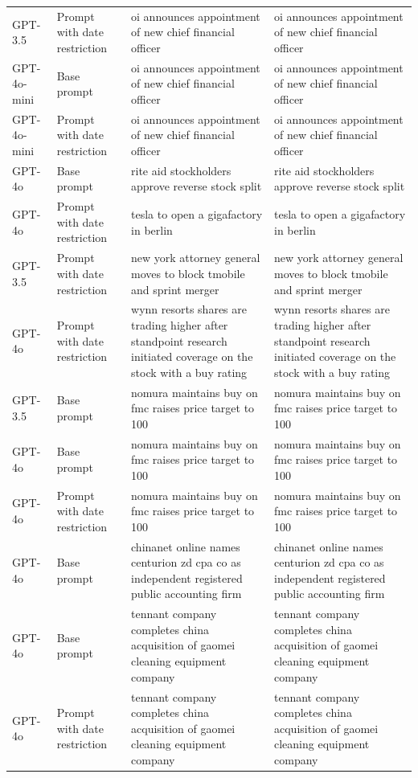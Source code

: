 \begin{longtable}{>{\raggedright\arraybackslash}p{1.4cm}>{\raggedright\arraybackslash}p{1.4cm}>{\raggedright\arraybackslash}p{5.5cm}>{\raggedright\arraybackslash}p{5.5cm}}
GPT-3.5 & Prompt with date restriction & oi announces appointment of new chief financial officer & oi announces appointment of new chief financial officer\\
GPT-4o-mini & Base prompt & oi announces appointment of new chief financial officer & oi announces appointment of new chief financial officer\\
GPT-4o-mini & Prompt with date restriction & oi announces appointment of new chief financial officer & oi announces appointment of new chief financial officer\\
GPT-4o & Base prompt & rite aid stockholders approve reverse stock split & rite aid stockholders approve reverse stock split\\
GPT-4o & Prompt with date restriction & tesla to open a gigafactory in berlin & tesla to open a gigafactory in berlin\\
GPT-3.5 & Prompt with date restriction & new york attorney general moves to block tmobile and sprint merger & new york attorney general moves to block tmobile and sprint merger\\
GPT-4o & Prompt with date restriction & wynn resorts shares are trading higher after standpoint research initiated coverage on the stock with a buy rating & wynn resorts shares are trading higher after standpoint research initiated coverage on the stock with a buy rating\\
GPT-3.5 & Base prompt & nomura maintains buy on fmc raises price target to 100 & nomura maintains buy on fmc raises price target to 100\\
GPT-4o & Base prompt & nomura maintains buy on fmc raises price target to 100 & nomura maintains buy on fmc raises price target to 100\\
GPT-4o & Prompt with date restriction & nomura maintains buy on fmc raises price target to 100 & nomura maintains buy on fmc raises price target to 100\\
GPT-4o & Base prompt & chinanet online names centurion zd cpa co as independent registered public accounting firm & chinanet online names centurion zd cpa co as independent registered public accounting firm\\
GPT-4o & Base prompt & tennant company completes china acquisition of gaomei cleaning equipment company & tennant company completes china acquisition of gaomei cleaning equipment company\\
GPT-4o & Prompt with date restriction & tennant company completes china acquisition of gaomei cleaning equipment company & tennant company completes china acquisition of gaomei cleaning equipment company\\

\end{longtable}
